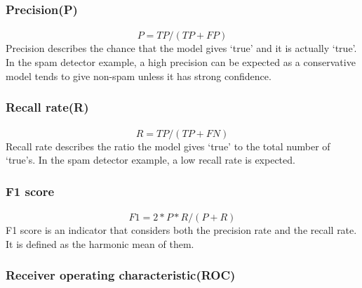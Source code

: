 \subsubsection{Precision(P)}
\paragraph{}
$$P=TP/(TP+FP)$$
Precision describes the chance that the model gives `true' and it is actually `true'.
In the spam detector example, a high precision can be expected as a conservative model tends to give non-spam unless it has strong confidence.

\subsubsection{Recall rate(R)}
\paragraph{}
$$R=TP/(TP+FN)$$
Recall rate describes the ratio the model gives `true' to the total number of `true's.
In the spam detector example, a low recall rate is expected.

\subsubsection{F1 score}
\paragraph{}
$$F1 = 2*P*R/(P+R)$$
F1 score is an indicator that considers both the precision rate and the recall rate.
It is defined as the harmonic mean of them.

\subsubsection{Receiver operating characteristic(ROC)}
